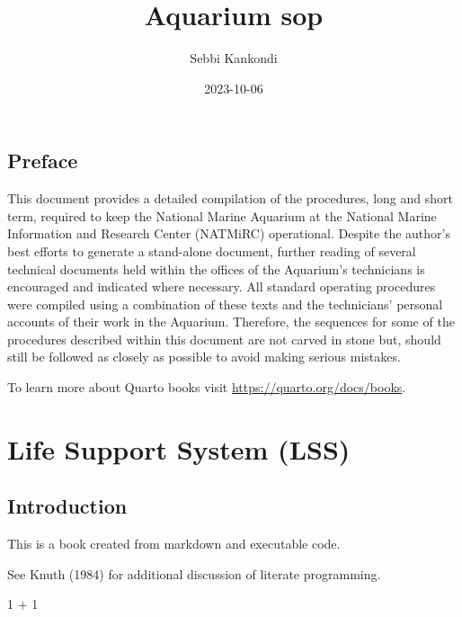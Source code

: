 \documentclass[
  letterpaper,
  DIV=11,
  numbers=noendperiod]{scrreprt}
\title{Aquarium sop}
\author{Sebbi Kankondi}
\date{2023-10-06}
\newenvironment{Shaded}{\begin{snugshade}}{\end{snugshade}}
\newcommand{\DecValTok}[1]{\textcolor[rgb]{0.25,0.63,0.44}{#1}}
\newcommand{\SpecialCharTok}[1]{\textcolor[rgb]{0.25,0.44,0.63}{#1}}
\renewcommand*\contentsname{Table of contents}
\newcommand\contentsname{Table of contents}
\begin{document}
\maketitle
\renewcommand*\contentsname{Table of contents}
{
\hypersetup{linkcolor=}
\setcounter{tocdepth}{2}
\tableofcontents
}

\hypertarget{preface}{%
\chapter*{Preface}\label{preface}}


This document provides a detailed compilation of the procedures, long
and short term, required to keep the National Marine Aquarium at the
National Marine Information and Research Center (NATMiRC) operational.
Despite the author's best efforts to generate a stand-alone document,
further reading of several technical documents held within the offices
of the Aquarium's technicians is encouraged and indicated where
necessary. All standard operating procedures were compiled using a
combination of these texts and the technicians' personal accounts of
their work in the Aquarium. Therefore, the sequences for some of the
procedures described within this document are not carved in stone but,
should still be followed as closely as possible to avoid making serious
mistakes.

To learn more about Quarto books visit
\url{https://quarto.org/docs/books}.

\part{Life Support System (LSS)}

\hypertarget{sec-introduction}{%
\chapter{Introduction}\label{sec-introduction}}

This is a book created from markdown and executable code.

See Knuth (1984) for additional discussion of literate programming.

\begin{Shaded}
\begin{Highlighting}[]
\DecValTok{1} \SpecialCharTok{+} \DecValTok{1}
\end{Highlighting}
\end{Shaded}
\end{document}
